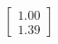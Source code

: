 \documentclass[preview]{standalone}
\begin{document}
\begin{align*}
\begin{bmatrix} 1.00 \\ 1.39 \end{bmatrix}
\end{align*}
\end{document}

